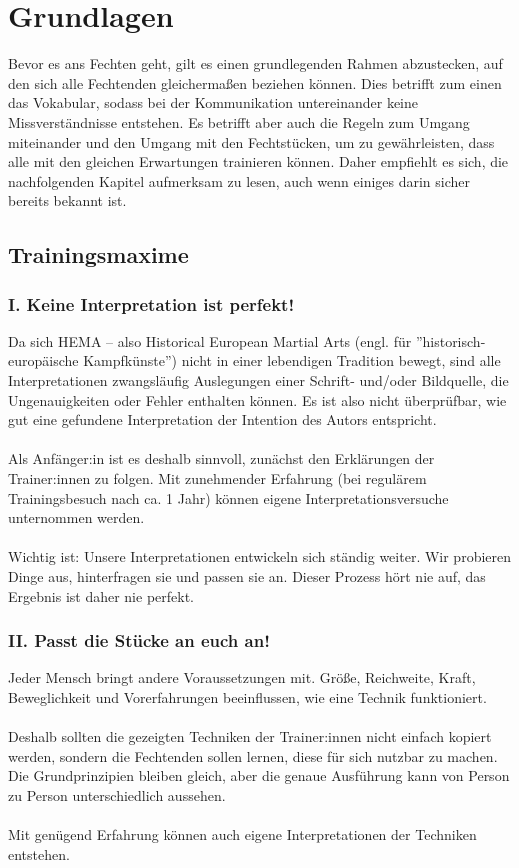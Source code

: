 \section{Grundlagen}

Bevor es ans Fechten geht, gilt es einen grundlegenden Rahmen abzustecken, auf den sich alle Fechtenden gleichermaßen beziehen können.
Dies betrifft zum einen das Vokabular, sodass bei der Kommunikation untereinander keine Missverständnisse entstehen.
Es betrifft aber auch die Regeln zum Umgang miteinander und den Umgang mit den Fechtstücken, um zu gewährleisten, dass alle mit den gleichen Erwartungen trainieren können.
Daher empfiehlt es sich, die nachfolgenden Kapitel aufmerksam zu lesen, auch wenn einiges darin sicher bereits bekannt ist.

\subsection{Trainingsmaxime}

\subsubsection*{I. Keine Interpretation ist perfekt!}

Da sich HEMA – also Historical European Martial Arts (engl. für ''historisch-europäische Kampfkünste'') nicht in einer lebendigen Tradition bewegt, sind alle Interpretationen zwangsläufig Auslegungen einer Schrift- und/oder Bildquelle, die Ungenauigkeiten oder Fehler enthalten können.
Es ist also nicht überprüfbar, wie gut eine gefundene Interpretation der Intention des Autors entspricht.
\\
\\
Als Anfänger:in ist es deshalb sinnvoll, zunächst den Erklärungen der Trainer:innen zu folgen.
Mit zunehmender Erfahrung (bei regulärem Trainingsbesuch nach ca. 1 Jahr) können eigene Interpretationsversuche unternommen werden.
\\
\\
Wichtig ist: Unsere Interpretationen entwickeln sich ständig weiter.
Wir probieren Dinge aus, hinterfragen sie und passen sie an.
Dieser Prozess hört nie auf, das Ergebnis ist daher nie perfekt.

\subsubsection*{II. Passt die Stücke an euch an!}

Jeder Mensch bringt andere Voraussetzungen mit.
Größe, Reichweite, Kraft, Beweglichkeit und Vorerfahrungen beeinflussen, wie eine Technik funktioniert.
\\
\\
Deshalb sollten die gezeigten Techniken der Trainer:innen nicht einfach kopiert werden, sondern die Fechtenden sollen lernen, diese für sich nutzbar zu machen.
Die Grundprinzipien bleiben gleich, aber die genaue Ausführung kann von Person zu Person unterschiedlich aussehen.
\\
\\
Mit genügend Erfahrung können auch eigene Interpretationen der Techniken entstehen.

